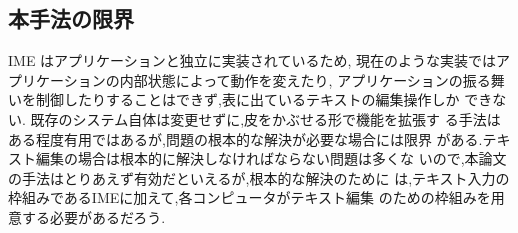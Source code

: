 \subsection{本手法の限界}

IME はアプリケーションと独立に実装されているため,
現在のような実装ではアプリケーションの内部状態によって動作を変えたり,
アプリケーションの振る舞いを制御したりすることはできず,表に出ているテキストの編集操作しか
できない. 既存のシステム自体は変更せずに,皮をかぶせる形で機能を拡張す
る手法はある程度有用ではあるが,問題の根本的な解決が必要な場合には限界
がある.テキスト編集の場合は根本的に解決しなければならない問題は多くな
いので,本論文の手法はとりあえず有効だといえるが,根本的な解決のために
は,テキスト入力の枠組みであるIMEに加えて,各コンピュータがテキスト編集
のための枠組みを用意する必要があるだろう.



